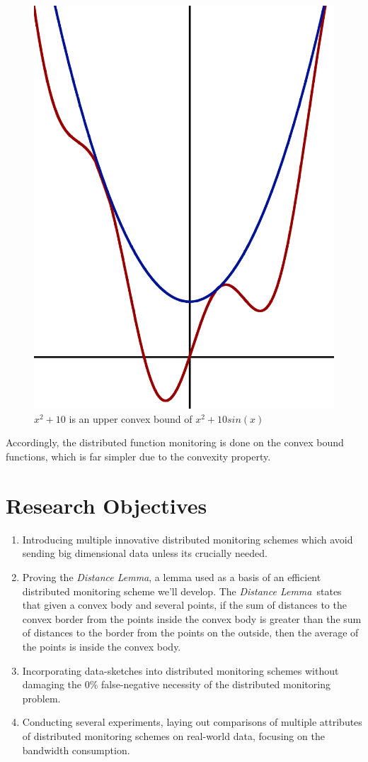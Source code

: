 \documentclass[11pt, conference]{article}
\newcommand{\distanceLemma}{\textit{Distance Lemma}}
\begin{document}
\begin{figure}[t]
\begin{center}
\includegraphics[width=0.3\linewidth]{Pics/PNGs/ConvexBound.png}
\end{center}
\caption{$x^2+10$ is an upper convex bound of $x^2+10sin(x)$}
\end{figure}

Accordingly, the distributed function monitoring is done on the convex bound functions, which is far simpler due to the convexity property.

\section{Research Objectives}

\begin{enumerate}
\item Introducing multiple innovative distributed monitoring schemes which avoid sending big dimensional data unless its crucially needed.

\item Proving the \distanceLemma , a lemma used as a basis of an efficient distributed monitoring scheme we'll develop. The \distanceLemma \ states that given a convex body and several points, if the sum of distances to the convex border from the points inside the convex body is greater than the sum of distances to the border from the points on the outside, then the average of the points is inside the convex body.

\item Incorporating data-sketches into distributed monitoring schemes without damaging the 0\% false-negative necessity of the distributed monitoring problem.

\item Conducting several experiments, laying out comparisons of multiple attributes of distributed monitoring schemes on real-world data, focusing on the bandwidth consumption.
\end{enumerate}



	
\end{document}
